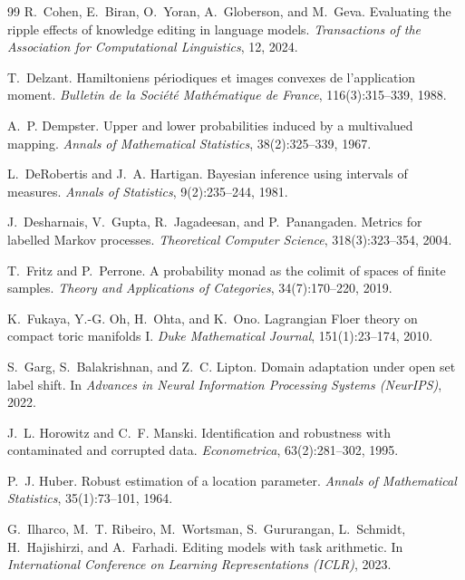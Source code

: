 \documentclass[11pt]{article}
\theoremstyle{definition}
\theoremstyle{remark}
\begin{document}
\begin{thebibliography}{99}
R.~Cohen, E.~Biran, O.~Yoran, A.~Globerson, and M.~Geva.
\newblock Evaluating the ripple effects of knowledge editing in language models.
\newblock \emph{Transactions of the Association for Computational Linguistics}, 12, 2024.

T.~Delzant.
\newblock Hamiltoniens p\'eriodiques et images convexes de l'application moment.
\newblock \emph{Bulletin de la Soci\'et\'e Math\'ematique de France}, 116(3):315--339, 1988.

A.~P. Dempster.
\newblock Upper and lower probabilities induced by a multivalued mapping.
\newblock \emph{Annals of Mathematical Statistics}, 38(2):325--339, 1967.

L.~DeRobertis and J.~A. Hartigan.
\newblock Bayesian inference using intervals of measures.
\newblock \emph{Annals of Statistics}, 9(2):235--244, 1981.

J.~Desharnais, V.~Gupta, R.~Jagadeesan, and P.~Panangaden.
\newblock Metrics for labelled {M}arkov processes.
\newblock \emph{Theoretical Computer Science}, 318(3):323--354, 2004.

T.~Fritz and P.~Perrone.
\newblock A probability monad as the colimit of spaces of finite samples.
\newblock \emph{Theory and Applications of Categories}, 34(7):170--220, 2019.

K.~Fukaya, Y.-G. Oh, H.~Ohta, and K.~Ono.
\newblock Lagrangian {F}loer theory on compact toric manifolds {I}.
\newblock \emph{Duke Mathematical Journal}, 151(1):23--174, 2010.

S.~Garg, S.~Balakrishnan, and Z.~C. Lipton.
\newblock Domain adaptation under open set label shift.
\newblock In \emph{Advances in Neural Information Processing Systems (NeurIPS)}, 2022.

J.~L. Horowitz and C.~F. Manski.
\newblock Identification and robustness with contaminated and corrupted data.
\newblock \emph{Econometrica}, 63(2):281--302, 1995.

P.~J. Huber.
\newblock Robust estimation of a location parameter.
\newblock \emph{Annals of Mathematical Statistics}, 35(1):73--101, 1964.

G.~Ilharco, M.~T. Ribeiro, M.~Wortsman, S.~Gururangan, L.~Schmidt, H.~Hajishirzi, and A.~Farhadi.
\newblock Editing models with task arithmetic.
\newblock In \emph{International Conference on Learning Representations (ICLR)}, 2023.


\end{thebibliography}
\end{document}
